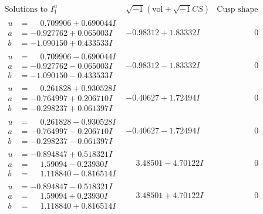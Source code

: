 \documentclass[1p]{elsarticle_modified}
\theoremstyle{definition}
\newcommand{\I}{\sqrt{-1}}
\begin{document}
$$\begin{array}{c|c|c}  
\text{Solutions to }I^u_{1}& \I (\text{vol} + \sqrt{-1}CS) & \text{Cusp shape}\\
 \hline 
\begin{aligned}
u &= \phantom{-}0.709906 + 0.690044 I \\
a &= -0.927762 + 0.065003 I \\
b &= -1.090150 + 0.433533 I\end{aligned}
 & -0.98312 + 1.83332 I & \phantom{-0.000000 } 0 \\ \hline\begin{aligned}
u &= \phantom{-}0.709906 - 0.690044 I \\
a &= -0.927762 - 0.065003 I \\
b &= -1.090150 - 0.433533 I\end{aligned}
 & -0.98312 - 1.83332 I & \phantom{-0.000000 } 0 \\ \hline\begin{aligned}
u &= \phantom{-}0.261828 + 0.930528 I \\
a &= -0.764997 + 0.206710 I \\
b &= -0.298237 + 0.061397 I\end{aligned}
 & -0.40627 + 1.72494 I & \phantom{-0.000000 } 0 \\ \hline\begin{aligned}
u &= \phantom{-}0.261828 - 0.930528 I \\
a &= -0.764997 - 0.206710 I \\
b &= -0.298237 - 0.061397 I\end{aligned}
 & -0.40627 - 1.72494 I & \phantom{-0.000000 } 0 \\ \hline\begin{aligned}
u &= -0.894847 + 0.518321 I \\
a &= \phantom{-}1.59094 - 0.23930 I \\
b &= \phantom{-}1.118840 - 0.816514 I\end{aligned}
 & \phantom{-}3.48501 - 4.70122 I & \phantom{-0.000000 } 0 \\ \hline\begin{aligned}
u &= -0.894847 - 0.518321 I \\
a &= \phantom{-}1.59094 + 0.23930 I \\
b &= \phantom{-}1.118840 + 0.816514 I\end{aligned}
 & \phantom{-}3.48501 + 4.70122 I & \phantom{-0.000000 } 0 \\ \hline\begin{aligned}

\end{aligned}
\end{array}$$
\end{document}
